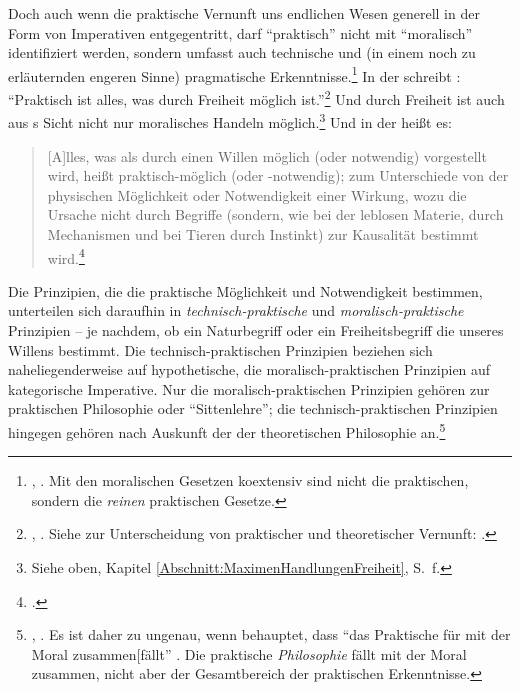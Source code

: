 Doch auch wenn die praktische Vernunft uns endlichen Wesen generell in der Form
von Imperativen entgegentritt, darf \enquote{praktisch} nicht mit
\enquote{moralisch} identifiziert werden, sondern umfasst auch technische und
(in einem noch zu erläuternden engeren Sinne) pragmatische
Erkenntnisse.\footnote{\cite[Vgl.][B~828]{Kant:KritikderreinenVernunft2003}, \cite[III: 520.1-16]{Kant:GesammelteWerke1900ff.}. Mit den moralischen Gesetzen
koextensiv sind nicht die praktischen, sondern die \emph{reinen} praktischen
Gesetze.} In der  schreibt
: \enquote{Praktisch ist alles, was durch Freiheit möglich
ist.}\footnote{\cite[B~828]{Kant:KritikderreinenVernunft2003}, \cite[III:
520.1]{Kant:GesammelteWerke1900ff.}. Siehe zur Unterscheidung von praktischer
und theoretischer Vernunft:
\cite{Engstrom:KantsDistinctionbetweenTheoreticalandPracticalKnowledge2002}.}
Und durch Freiheit ist auch aus s Sicht nicht nur
moralisches Handeln möglich.\footnote{Siehe oben, Kapitel \ref{Abschnitt:MaximenHandlungenFreiheit},
S.~\pageref{Abschnitt:MaximenHandlungenFreiheit}f.} Und in der  heißt es:
\begin{quote}
[A]lles, was als durch einen Willen möglich (oder notwendig) vorgestellt wird,
heißt praktisch-möglich (oder -notwendig); zum Unterschiede von der physischen
Möglichkeit oder Notwendigkeit einer Wirkung, wozu die Ursache nicht durch
Begriffe (sondern, wie bei der leblosen Materie, durch Mechanismen und bei
Tieren durch Instinkt) zur Kausalität bestimmt
wird.\footnote{\cite[][B xii\,f.,]{Kant:KritikderUrteilskraft2009}
\cite[][V: 172.6--11]{Kant:GesammelteWerke1900ff.}.}
\end{quote}
Die Prinzipien, die die praktische Möglichkeit und Notwendigkeit bestimmen,
unterteilen sich daraufhin in \emph{technisch-praktische} und
\emph{moralisch-praktische}
Prinzipien -- je nachdem, ob ein Naturbegriff oder ein Freiheitsbegriff die
 unseres Willens bestimmt. Die technisch-praktischen Prinzipien
beziehen sich naheliegenderweise auf hypothetische, die moralisch-praktischen
Prinzipien auf kategorische Imperative. Nur die moralisch-praktischen Prinzipien
gehören zur praktischen Philosophie oder \enquote{Sittenlehre}; die
technisch-praktischen Prinzipien hingegen gehören nach Auskunft der
 der theoretischen Philosophie
an.\footnote{\cite[Vgl.][B
xiii]{Kant:KritikderUrteilskraft2009}, \cite[][V:
172.14--22]{Kant:GesammelteWerke1900ff.}. Es ist daher zu ungenau, wenn
behauptet, dass \enquote{das Praktische für  mit der
Moral zusammen[fällt}
\parencite[][49]{Fonnesu:KantspraktischePhilosophieunddieVerwirklichungderMoral2004}.
Die praktische \emph{Philosophie} fällt mit der Moral zusammen, nicht aber der
Gesamtbereich der praktischen Erkenntnisse.}

